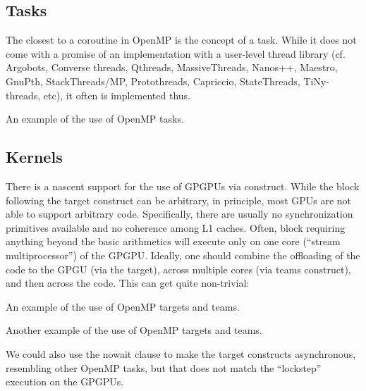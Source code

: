 \subsection{Tasks}

The closest to a coroutine in OpenMP is the concept of a task. While it does not come with a promise of an implementation with a user-level thread library (cf. Argobots, Converse threads,	Qthreads,	MassiveThreads, Nanos++, Maestro, GnuPth, StackThreads/MP, Protothreads, Capriccio, StateThreads, TiNy-threads, etc), it often is implemented thus.  

\raggedbottom
\begin{codebox}[]{\href{https://godbolt.org/z/TM5WjPvT9}{\ExternalLink}}
\footnotesize An example of the use of OpenMP tasks.
\tcblower
{}
\end{codebox}

\subsection{Kernels}

There is a nascent support for the use of GPGPUs via  construct.
While the block following the target construct can be arbitrary, in principle, most GPUs are not able to support arbitrary code. Specifically, there are usually no synchronization primitives available and no coherence among L1 caches. Often, block requiring anything beyond the basic arithmetics will execute only on one core (``stream multiprocessor'') of the GPGPU. Ideally, one should combine the offloading of the code to the GPGU (via the target), across multiple cores (via teams construct), and then across the code. This can get quite non-trivial:

\raggedbottom
\begin{codebox}[]{\href{https://godbolt.org/z/TM5WjPvT9}{\ExternalLink}}
\footnotesize An example of the use of OpenMP targets and teams.
\tcblower
{}
\end{codebox}

\raggedbottom
\begin{codebox}[]{}{}
\footnotesize Another example of the use of OpenMP targets and teams.
\tcblower
{}
\end{codebox}

We could also use the nowait clause to make the target constructs asynchronous, resembling other OpenMP tasks,
but that does not match the ``lockstep'' execution on the GPGPUs. 

